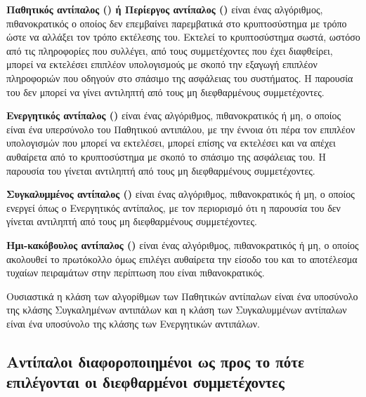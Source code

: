 \begin{definition}
\textbf{Παθητικός αντίπαλος () ή Περίεργος αντίπαλος ()} είναι ένας αλγόριθμος, πιθανοκρατικός ο οποίος δεν επεμβαίνει παρεμβατικά στο κρυπτοσύστημα με τρόπο ώστε να αλλάξει τον τρόπο εκτέλεσης του. Εκτελεί το κρυπτοσύστημα σωστά, ωστόσο από τις πληροφορίες που συλλέγει, από τους συμμετέχοντες που έχει διαφθείρει, μπορεί να εκτελέσει επιπλέον υπολογισμούς με σκοπό την εξαγωγή επιπλέον πληροφοριών που οδηγούν στο σπάσιμο της ασφάλειας του συστήματος. Η παρουσία του δεν μπορεί να γίνει αντιληπτή από τους μη διεφθαρμένους συμμετέχοντες.
\end{definition}

\begin{definition}
\textbf{Ενεργητικός αντίπαλος ()} είναι ένας αλγόριθμος, πιθανοκρατικός ή μη, ο οποίος είναι ένα υπερσύνολο του Παθητικού αντιπάλου, με την έννοια ότι πέρα τον επιπλέον υπολογισμών που μπορεί να εκτελέσει, μπορεί επίσης να εκτελέσει και να απέχει αυθαίρετα από το κρυπτοσύστημα με σκοπό το σπάσιμο της ασφάλειας του. Η παρουσία του γίνεται αντιληπτή από τους μη διεφθαρμένους συμμετέχοντες.
\end{definition}

\begin{definition}
\textbf{Συγκαλυμμένος αντίπαλος ()} είναι ένας αλγόριθμος, πιθανοκρατικός ή μη, ο οποίος ενεργεί όπως ο Ενεργητικός αντίπαλος, με τον περιορισμό ότι η παρουσία του δεν γίνεται αντιληπτή από τους μη διεφθαρμένους συμμετέχοντες.
\end{definition}

\begin{definition}
\textbf{Ημι-κακόβουλος αντίπαλος ()} είναι ένας αλγόριθμος, πιθανοκρατικός ή μη, ο οποίος ακολουθεί το πρωτόκολλο όμως επιλέγει αυθαίρετα την είσοδο του και το αποτέλεσμα τυχαίων πειραμάτων στην περίπτωση που είναι πιθανοκρατικός.
\end{definition}

Ουσιαστικά η κλάση των αλγορίθμων των Παθητικών αντίπαλων είναι ένα υποσύνολο της κλάσης Συγκαλημένων αντιπάλων και η κλάση των Συγκαλυμμένων αντίπαλων είναι ένα υποσύνολο της κλάσης των Ενεργητικών αντιπάλων.

\subsection{Αντίπαλοι διαφοροποιημένοι ως προς το πότε επιλέγονται οι διεφθαρμένοι συμμετέχοντες}

